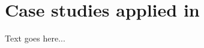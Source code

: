\documentclass[../msc-thesis.tex]{subfiles}
\begin{document}
\chapter{Case studies applied in \mtc}

Text goes here...
    
\end{document}
